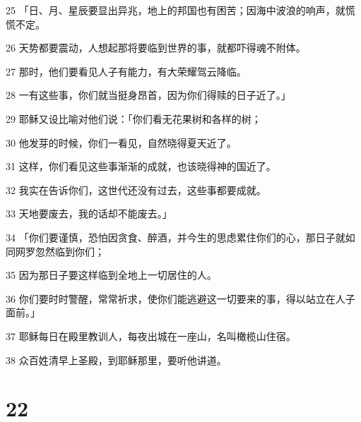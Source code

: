 \par 25 「日、月、星辰要显出异兆，地上的邦国也有困苦；因海中波浪的响声，就慌慌不定。
\par 26 天势都要震动，人想起那将要临到世界的事，就都吓得魂不附体。
\par 27 那时，他们要看见人子有能力，有大荣耀驾云降临。
\par 28 一有这些事，你们就当挺身昂首，因为你们得赎的日子近了。」
\par 29 耶稣又设比喻对他们说：「你们看无花果树和各样的树；
\par 30 他发芽的时候，你们一看见，自然晓得夏天近了。
\par 31 这样，你们看见这些事渐渐的成就，也该晓得神的国近了。
\par 32 我实在告诉你们，这世代还没有过去，这些事都要成就。
\par 33 天地要废去，我的话却不能废去。」
\par 34 「你们要谨慎，恐怕因贪食、醉酒，并今生的思虑累住你们的心，那日子就如同网罗忽然临到你们；
\par 35 因为那日子要这样临到全地上一切居住的人。
\par 36 你们要时时警醒，常常祈求，使你们能逃避这一切要来的事，得以站立在人子面前。」
\par 37 耶稣每日在殿里教训人，每夜出城在一座山，名叫橄榄山住宿。
\par 38 众百姓清早上圣殿，到耶稣那里，要听他讲道。

\chapter{22}

